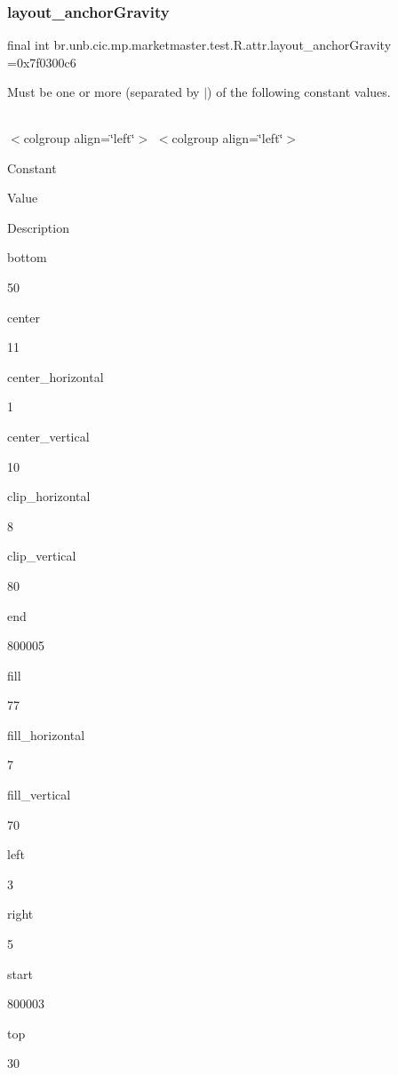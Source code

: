 \subsubsection{\texorpdfstring{layout\+\_\+anchor\+Gravity}{layout\_anchorGravity}}
{\footnotesize\ttfamily final int br.\+unb.\+cic.\+mp.\+marketmaster.\+test.\+R.\+attr.\+layout\+\_\+anchor\+Gravity =0x7f0300c6\hspace{0.3cm}{\ttfamily [static]}}

Must be one or more (separated by \textquotesingle{}$\vert$\textquotesingle{}) of the following constant values.

\tabulinesep=1mm
\begin{longtabu} spread 0pt [c]{*{0}{|X[-1]}|}
\hline
\end{longtabu}
$<$colgroup align=\char`\"{}left\char`\"{}$>$ $<$colgroup align=\char`\"{}left\char`\"{}$>$ 

Constant

Value

Description 

bottom

50

center

11

center\+\_\+horizontal

1

center\+\_\+vertical

10

clip\+\_\+horizontal

8

clip\+\_\+vertical

80

end

800005

fill

77

fill\+\_\+horizontal

7

fill\+\_\+vertical

70

left

3

right

5

start

800003

top

30\mbox{\label{classbr_1_1unb_1_1cic_1_1mp_1_1marketmaster_1_1test_1_1R_1_1attr_a94ee51a9eba89fe7dc80b56274a859e1}} 
